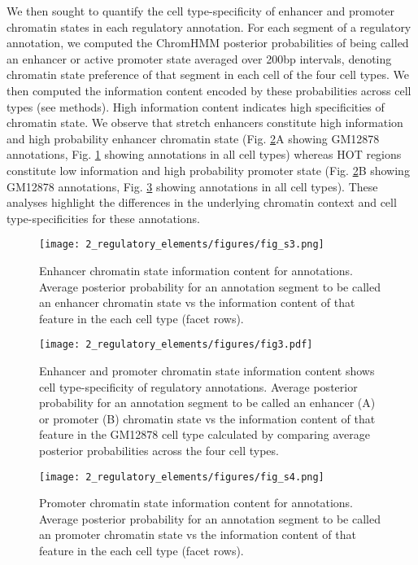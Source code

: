 We then sought to quantify the cell type-specificity of enhancer and promoter chromatin states in each regulatory annotation. For each segment of a regulatory annotation, we computed the ChromHMM posterior probabilities of being called an enhancer or active promoter state averaged over 200bp intervals, denoting chromatin state preference of that segment in each cell of the four cell types. We then computed the information content encoded by these probabilities across cell types (see methods). High information content indicates high specificities of chromatin state. We observe that stretch enhancers constitute high information and high probability enhancer chromatin state (Fig. \ref{fig:c1_f3}A showing GM12878 annotations, Fig. \ref{fig:c1_fs3} showing annotations in all cell types) whereas HOT regions constitute low information and high probability promoter state (Fig. \ref{fig:c1_f3}B showing GM12878 annotations, Fig. \ref{fig:c1_fs4} showing annotations in all cell types). These analyses highlight the differences in the underlying chromatin context and cell type-specificities for these annotations.

\begin{figure}
    \centering
    \texttt{[image: 2\_regulatory\_elements/figures/fig\_s3.png]}
    \caption{Enhancer chromatin state information content for annotations. Average posterior probability for an annotation segment to be called an enhancer chromatin state vs the information content of that feature in the each cell type (facet rows).}
    \label{fig:c1_fs3}
\end{figure}

\begin{figure}
    \centering
    \texttt{[image: 2\_regulatory\_elements/figures/fig3.pdf]}
    \caption{Enhancer and promoter chromatin state information content shows cell type-specificity of regulatory annotations. Average posterior probability for an annotation segment to be called an enhancer (A) or promoter (B) chromatin state vs the information content of that feature in the GM12878 cell type calculated by comparing average posterior probabilities across the four cell types.}
    \label{fig:c1_f3}
\end{figure}

\begin{figure}
    \centering
    \texttt{[image: 2\_regulatory\_elements/figures/fig\_s4.png]}
    \caption{Promoter chromatin state information content for annotations. Average posterior probability for an annotation segment to be called an promoter chromatin state vs the information content of that feature in the each cell type (facet rows).}
    \label{fig:c1_fs4}
\end{figure}

